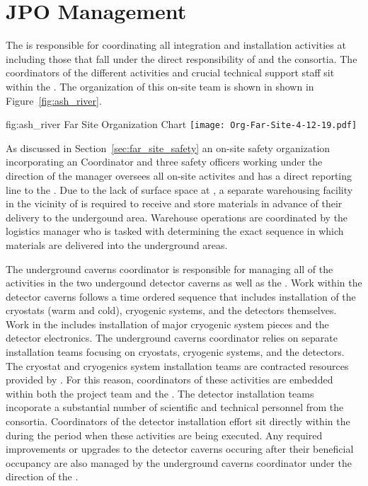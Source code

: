 \section{JPO Management}
\label{vl:tc-facility_mgmt}

The  is responsible for coordinating all integration and
installation activities at  including those that fall 
under the direct responsibility of  and the  
consortia.  The coordinators of the different activities and crucial 
technical support staff sit within the .  The organization
of this on-site team is shown in shown in Figure~\ref{fig:ash_river}.  

\begin{dunefigure}{fig:ash_river}
  {Far Site Organization Chart}
  \texttt{[image: Org-Far-Site-4-12-19.pdf]}
\end{dunefigure}
 
As discussed in Section~\ref{sec:far_site_safety} an on-site safety 
organization incorporating an  Coordinator and three 
safety officers working under the direction of the  
 manager oversees all on-site activites and has a direct 
reporting line to the .  Due to the lack of surface space 
at , a separate warehousing facility in the vicinity of 
 is required to receive and store materials in advance 
of their delivery to the undergound area.  Warehouse operations are 
coordinated by the  logistics manager who is tasked 
with determining the exact sequence in which materials are delivered
into the underground areas.         

The underground caverns coordinator is responsible for managing all 
of the activities in the two undergound detector caverns as well as 
the .  Work within the detector caverns follows a time 
ordered sequence that includes installation of the cryostats (warm
and cold), cryogenic systems, and the detectors themselves.  Work 
in the  includes installation of major cryogenic system 
pieces and the detector  electronics.  The underground 
caverns coordinator relies on separate installation teams focusing 
on cryostats, cryogenic systems, and the detectors.  The cryostat 
and cryogenics system installation teams are contracted resources 
provided by .  For this reason, coordinators of these 
activities are embedded within both the  project team 
and the .  The detector installation teams incoporate a 
substantial number of scientific and technical personnel from the 
 consortia.  Coordinators of the detector installation 
effort sit directly within the  during the period when 
these activities are being executed.  Any required improvements or 
upgrades to the detector caverns occuring after their beneficial 
occupancy are also managed by the underground caverns coordinator  
under the direction of the .

